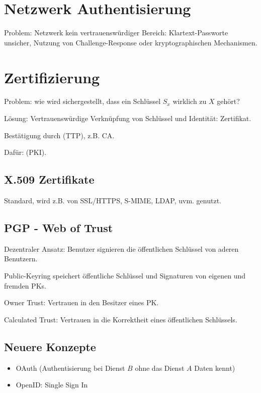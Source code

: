 \section{Netzwerk Authentisierung}
Problem: Netzwerk kein vertrauenswürdiger Bereich: Klartext-Passworte unsicher, Nutzung von Challenge-Response oder kryptographischen Mechanismen.

\section{Zertifizierung}
Problem: wie wird sichergestellt, dass ein Schlüssel $S_x$ wirklich zu $X$ gehört?

Lösung: Vertrauenswürdige Verknüpfung von Schlüssel und Identität: Zertifikat.

Bestätigung durch  (TTP), z.B. CA.

Dafür:  (PKI).

\subsection{X.509 Zertifikate}
Standard, wird z.B. von SSL/HTTPS, S-MIME, LDAP, uvm. genutzt.

\subsection{PGP - Web of Trust}
Dezentraler Ansatz: Benutzer signieren die öffentlichen Schlüssel von aderen Benutzern.

Public-Keyring speichert öffentliche Schlüssel und Signaturen von eigenen und fremden PKs.

Owner Trust: Vertrauen in den Besitzer eines PK.

Calculated Trust: Vertrauen in die Korrektheit eines öffentlichen Schlüssels.

\subsection{Neuere Konzepte}
\begin{itemize}
    \item OAuth (Authentisierung bei Dienst $B$ ohne das Dienst $A$ Daten kennt)
    \item OpenID: Single Sign In
\end{itemize}
